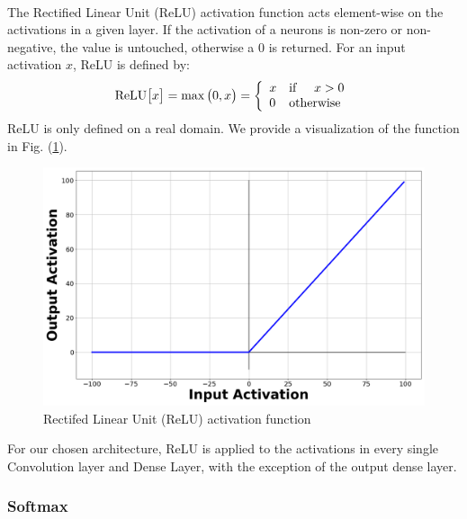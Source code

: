 \documentclass[12pt,letterpaper]{article}
\begin{document}
\paragraph*{}The Rectified Linear Unit (ReLU) activation function acts element-wise on the activations in a given layer. If the activation of a neurons is non-zero or non-negative, the value is untouched, otherwise a $0$ is returned. For an input activation $x$, ReLU is defined by:
\begin{equation}
\label{eqn-ReLU}
\text{ReLU}\big[x\big] = \max\big(0,x\big) = \left\{
\begin{array}{ll}
    x & \text{if\hspace{0.5cm}} x > 0 \\
    0 & \text{otherwise}
\end{array} 
\right.
\end{equation}
ReLU is only defined on a real domain. We provide a visualization of the function in Fig. (\ref{fig-ReLU}).
\begin{figure}[H]
\begin{center}
\includegraphics[scale=0.2]{../Figures/RectifiedLinearUnit}
\end{center}
\caption{Rectifed Linear Unit (ReLU) activation function}
\label{fig-ReLU}
\end{figure}
For our chosen architecture, ReLU is applied to the activations in every single Convolution layer and Dense Layer, with the exception of the output dense layer.


\subsubsection{Softmax}
\label{subsubsec-Softmax}
\end{document}
